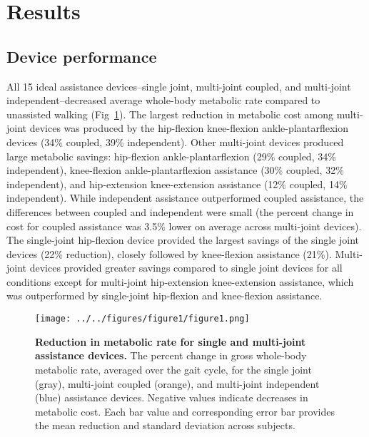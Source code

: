 \documentclass[10pt,letterpaper]{article}
\begin{document}
\section*{Results}

\subsection*{Device performance}
All 15 ideal assistance devices--single joint, multi-joint coupled, and multi-joint independent--decreased average whole-body metabolic rate compared to unassisted walking (Fig~\ref{Fig1}). The largest reduction in metabolic cost among multi-joint devices was produced by the hip-flexion knee-flexion ankle-plantarflexion devices (34\% coupled, 39\% independent). Other multi-joint devices produced large metabolic savings: hip-flexion ankle-plantarflexion (29\% coupled, 34\% independent), knee-flexion ankle-plantarflexion assistance (30\% coupled, 32\% independent), and hip-extension knee-extension assistance (12\% coupled, 14\% independent).  While independent assistance outperformed coupled assistance, the differences between coupled and independent were small (the percent change in cost for coupled assistance was 3.5\% lower on average across multi-joint devices). The single-joint hip-flexion device provided the largest savings of the single joint devices (22\% reduction), closely followed by knee-flexion assistance (21\%). Multi-joint devices provided greater savings compared to single joint devices for all conditions except for multi-joint hip-extension knee-extension assistance, which was outperformed by single-joint hip-flexion and knee-flexion assistance.

\begin{figure}[!h]
\begin{adjustwidth}{-1in}{0in} %
    \centering
    \texttt{[image: ../../figures/figure1/figure1.png]}
    \caption{{\bf Reduction in metabolic rate for single and multi-joint assistance devices.}
        The percent change in gross whole-body metabolic rate, averaged over the gait cycle, for the single joint (gray), multi-joint coupled (orange), and multi-joint independent (blue) assistance devices. Negative values indicate decreases in metabolic cost. Each bar value and corresponding error bar provides the mean reduction and standard deviation across subjects.}
\label{Fig1}
\end{adjustwidth}
\end{figure} 
\end{document}
